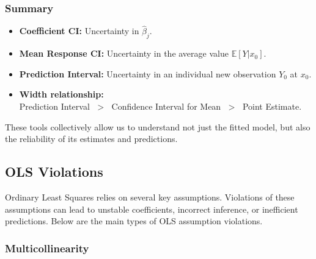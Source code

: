 \documentclass[11pt,a4paper]{article}
\begin{document}
\subsubsection{Summary}

\begin{itemize}
    \item \textbf{Coefficient CI:} Uncertainty in $\hat{\beta}_j$.  
    \item \textbf{Mean Response CI:} Uncertainty in the average value $\mathbb{E}[Y|x_0]$.  
    \item \textbf{Prediction Interval:} Uncertainty in an individual new observation $Y_0$ at $x_0$.  
    \item \textbf{Width relationship:} \\
    Prediction Interval $\;>\;$ Confidence Interval for Mean $\;>\;$ Point Estimate.
\end{itemize}

These tools collectively allow us to understand not just the fitted model,  
but also the reliability of its estimates and predictions.

\subsection{OLS Violations}

Ordinary Least Squares relies on several key assumptions.  
Violations of these assumptions can lead to unstable coefficients, incorrect inference,  
or inefficient predictions. Below are the main types of OLS assumption violations.

\subsubsection{Multicollinearity}
\end{document}
